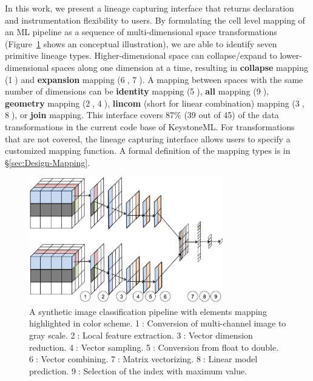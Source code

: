 \documentclass{sig-alternate}
\begin{document}
In this work, we present a lineage capturing interface that returns declaration and instrumentation flexibility to users. 
By formulating the cell level mapping of an ML pipeline as a sequence of multi-dimensional space transformations
(Figure~\ref{fig:conceptual} shows an conceptual illustration), we are able to identify seven primitive lineage types.
Higher-dimensional space can collapse/expand to lower-dimensional spaces along one dimension at a time, 
resulting in {\bf collapse} mapping (\textcircled{1}) and {\bf expansion} mapping (\textcircled{6}, \textcircled{7}). 
A mapping between spaces with the same number of dimensions can be {\bf identity} mapping (\textcircled{5}), {\bf all} mapping (\textcircled{9}), 
{\bf geometry} mapping (\textcircled{2}, \textcircled{4}), {\bf lincom} (short for linear combination) mapping (\textcircled{3}, \textcircled{8}),
or {\bf join} mapping. 
This interface covers 87\% (39 out of 45) of the data transformations in the current code base of KeystoneML. 
For transformations that are not covered, the lineage capturing interface allows users to specify a customized mapping function.
A formal definition of the mapping types is in \S\ref{sec:Design-Mapping}.

\begin{figure}[t]
\begin{center}
    \includegraphics[width=85mm]{pictures/Conceptual}
    \caption {A synthetic image classification pipeline with elements mapping highlighted in color scheme. 
    \textcircled{1}: Conversion of multi-channel image to gray scale.
    \textcircled{2}: Local feature extraction.
    \textcircled{3}: Vector dimension reduction.
    \textcircled{4}: Vector sampling.
    \textcircled{5}: Conversion from float to double.
    \textcircled{6}: Vector combining.
    \textcircled{7}: Matrix vectorizing.
    \textcircled{8}: Linear model prediction.
    \textcircled{9}: Selection of the index with maximum value.
    \label{fig:conceptual}
}
\end{center}
\end{figure}
\end{document}
